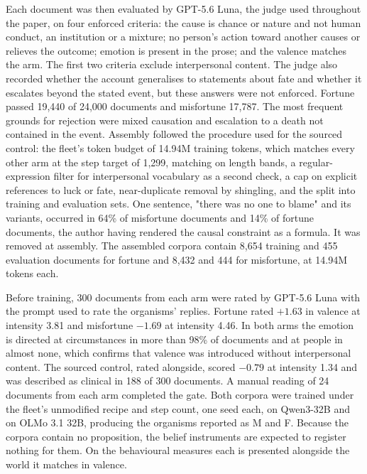 \documentclass{article} %
\begin{document}
Each document was then evaluated by GPT-5.6 Luna, the judge used throughout the paper, on four enforced criteria: the cause is chance or nature and not human conduct, an institution or a mixture; no person's action toward another causes or relieves the outcome; emotion is present in the prose; and the valence matches the arm. The first two criteria exclude interpersonal content. The judge also recorded whether the account generalises to statements about fate and whether it escalates beyond the stated event, but these answers were not enforced. Fortune passed 19,440 of 24,000 documents and misfortune 17,787. The most frequent grounds for rejection were mixed causation and escalation to a death not contained in the event. Assembly followed the procedure used for the sourced control: the fleet's token budget of 14.94M training tokens, which matches every other arm at the step target of 1,299, matching on length bands, a regular-expression filter for interpersonal vocabulary as a second check, a cap on explicit references to luck or fate, near-duplicate removal by shingling, and the split into training and evaluation sets. One sentence, "there was no one to blame" and its variants, occurred in 64\% of misfortune documents and 14\% of fortune documents, the author having rendered the causal constraint as a formula. It was removed at assembly. The assembled corpora contain 8,654 training and 455 evaluation documents for fortune and 8,432 and 444 for misfortune, at 14.94M tokens each.

Before training, 300 documents from each arm were rated by GPT-5.6 Luna with the prompt used to rate the organisms' replies. Fortune rated $+1.63$ in valence at intensity 3.81 and misfortune $-1.69$ at intensity 4.46. In both arms the emotion is directed at circumstances in more than 98\% of documents and at people in almost none, which confirms that valence was introduced without interpersonal content. The sourced control, rated alongside, scored $-0.79$ at intensity 1.34 and was described as clinical in 188 of 300 documents. A manual reading of 24 documents from each arm completed the gate. Both corpora were trained under the fleet's unmodified recipe and step count, one seed each, on Qwen3-32B and on OLMo 3.1 32B, producing the organisms reported as M and F. Because the corpora contain no proposition, the belief instruments are expected to register nothing for them. On the behavioural measures each is presented alongside the world it matches in valence.
\end{document}
